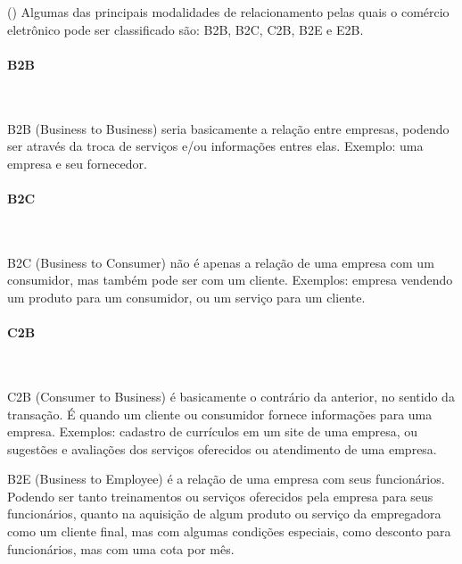 (\cite{b2c-web}) Algumas das principais modalidades de relacionamento pelas quais o comércio eletrônico pode ser classificado são: B2B, B2C, C2B, B2E e E2B.

\paragraph{B2B}\mbox{}\\
\par
B2B (Business to Business) seria basicamente a relação entre empresas, podendo ser através da troca de serviços e/ou informações entres elas. Exemplo: uma empresa e seu fornecedor.
\paragraph{B2C}\mbox{}\\
\par
B2C (Business to Consumer) não é apenas a relação de uma empresa com um consumidor, mas também pode ser com um cliente. Exemplos: empresa vendendo um produto para um consumidor, ou um serviço para um cliente.

\paragraph{C2B}\mbox{}\\
\par
C2B (Consumer to Business) é basicamente o contrário da anterior, no sentido da transação. É quando um cliente ou consumidor fornece informações para uma empresa. Exemplos: cadastro de currículos em um site de uma empresa, ou sugestões e avaliações dos serviços oferecidos ou atendimento de uma empresa.


\par
B2E (Business to Employee) é a relação de uma empresa com seus funcionários. Podendo ser tanto treinamentos ou serviços oferecidos pela empresa para seus funcionários, quanto na aquisição de algum produto ou serviço da empregadora como um cliente final, mas com algumas condições especiais, como desconto para funcionários, mas com uma cota por mês.
\newpage
